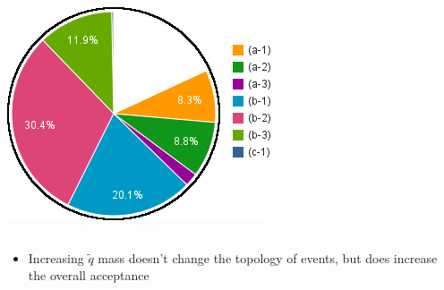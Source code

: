 \documentclass[compress]{beamer}
\begin{document}
\begin{frame}
\begin{columns}
\includegraphics[width=\linewidth]{chart2d_4mu_600.png}
\end{columns}

\vspace{0.3 cm}
\begin{itemize}
\item Increasing $\tilde{q}$ mass doesn't change the topology of
  events, but does increase the overall acceptance
\end{itemize}
\end{frame}
\end{document}
